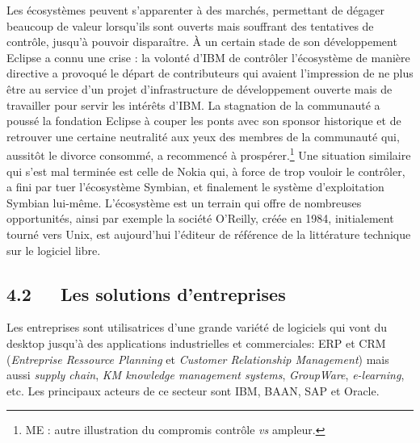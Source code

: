 \documentclass{FramateX}
\begin{document}
\begin{refsection}
Les écosystèmes peuvent s'apparenter à des marchés, permettant de
dégager beaucoup de valeur lorsqu'ils sont ouverts mais souffrant des
tentatives de contrôle, jusqu'à pouvoir disparaître. À un certain stade
de son développement Eclipse a connu une crise : la volonté d'IBM de
contrôler l'écosystème de manière directive a provoqué le départ de
contributeurs qui avaient l'impression de ne plus être au service d'un
projet d'infrastructure de développement ouverte mais de travailler
pour servir les intérêts d'IBM. La stagnation de la communauté a poussé
la fondation Eclipse à couper les ponts avec son sponsor historique et
de retrouver une certaine neutralité aux yeux des membres de la
communauté qui, aussitôt le divorce consommé, a recommencé à
prospérer.\footnote{ME : autre illustration du compromis contrôle
\textit{vs} ampleur.} Une situation similaire qui s'est mal terminée
est celle de Nokia qui, à force de trop vouloir le contrôler, a fini
par tuer l'écosystème Symbian, et finalement le système
d'exploitation Symbian lui-même. L'écosystème est un
terrain qui offre de nombreuses opportunités, ainsi par exemple la
société O'Reilly, créée en 1984, initialement tourné vers Unix, est
aujourd'hui l'éditeur de référence de la littérature technique sur le
logiciel libre.

\subsection*{4.2~~~Les solutions d'entreprises}
{}

Les entreprises sont utilisatrices d'une grande variété de logiciels qui
vont du desktop jusqu'à des applications industrielles et commerciales: ERP et CRM (\textit{Entreprise Ressource Planning} et \textit{Customer Relationship Management}) mais aussi \textit{supply chain},
\textit{KM knowledge management systems}, \textit{GroupWare},
\textit{e-learning}, etc. Les principaux acteurs de ce secteur sont
IBM, BAAN, SAP et Oracle. 


\end{refsection}
\end{document}

